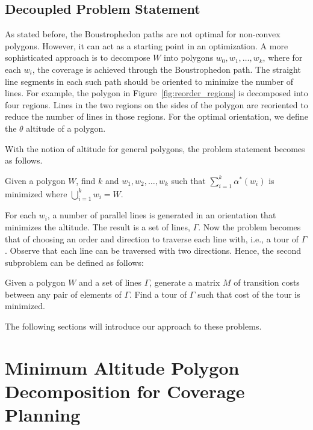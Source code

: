 \documentclass[../main.tex]{subfiles}
\begin{document}
\subsection{Decoupled Problem Statement}
\label{subsection:decoupled_problem_statement}

As stated before, the Boustrophedon paths are not optimal for non-convex polygons. However, it can act as a starting point in an optimization. A more sophisticated approach is to decompose $W$ into polygons $w_0,w_1,\ldots,w_k$, where for each $w_i$, the coverage is achieved through the Boustrophedon path. The straight line segments in each such path should be oriented to minimize the number of lines. For example, the polygon in Figure~\ref{fig:reorder_regions} is decomposed into four regions. Lines in the two regions on the sides of the polygon are reoriented to reduce the number of lines in those regions. For the optimal orientation, we define the $\theta$ altitude of a polygon.

With the notion of altitude for general polygons, the problem statement becomes as follows.
\begin{problem}
\label{prob:min_alt_decomp}
Given a polygon $W$, find $k$ and $w_1,w_2,\ldots,w_k$ such that $\sum^k_{i=1}\alpha^*(w_i)$ is minimized where $\bigcup^k_{i=1}w_i=W$.
\end{problem}

For each $w_i$, a number of parallel lines is generated in an orientation that minimizes the altitude. The result is a set of lines, $\Gamma$. Now the problem becomes that of choosing an order and direction to traverse each line with, i.e., a tour of $\Gamma$. Observe that each line can be traversed with two directions. Hence, the second subproblem can be defined as follows:

\begin{problem}
\label{prob:min_tour}
Given a polygon $W$ and a set of lines $\Gamma$, generate a matrix $M$ of transition costs between any pair of elements of $\Gamma$. Find a tour of $\Gamma$ such that cost of the tour is minimized.
\end{problem}%
The following sections will introduce our approach to these problems.


\section{Minimum Altitude Polygon Decomposition for Coverage Planning}
\label{section:min_alt_decomposition}
\end{document}
